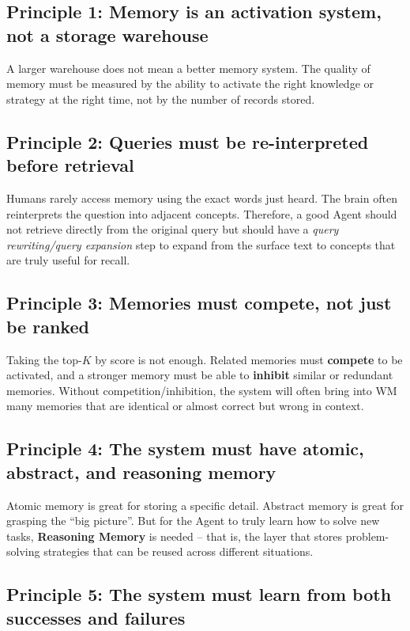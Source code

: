 \documentclass[a4paper,12pt]{article}
\begin{document}
\subsection*{Principle 1: Memory is an activation system, not a storage warehouse}

A larger warehouse does not mean a better memory system. The quality of memory must be measured by the ability to activate the right knowledge or strategy at the right time, not by the number of records stored.

\subsection*{Principle 2: Queries must be re-interpreted before retrieval}

Humans rarely access memory using the exact words just heard. The brain often reinterprets the question into adjacent concepts. Therefore, a good Agent should not retrieve directly from the original query but should have a \emph{query rewriting/query expansion} step to expand from the surface text to concepts that are truly useful for recall.

\subsection*{Principle 3: Memories must compete, not just be ranked}

Taking the top-$K$ by score is not enough. Related memories must \textbf{compete} to be activated, and a stronger memory must be able to \textbf{inhibit} similar or redundant memories. Without competition/inhibition, the system will often bring into WM many memories that are identical or almost correct but wrong in context.

\subsection*{Principle 4: The system must have atomic, abstract, and reasoning memory}

Atomic memory is great for storing a specific detail. Abstract memory is great for grasping the ``big picture''. But for the Agent to truly learn how to solve new tasks, \textbf{Reasoning Memory} is needed -- that is, the layer that stores problem-solving strategies that can be reused across different situations.

\subsection*{Principle 5: The system must learn from both successes and failures}
\end{document}
